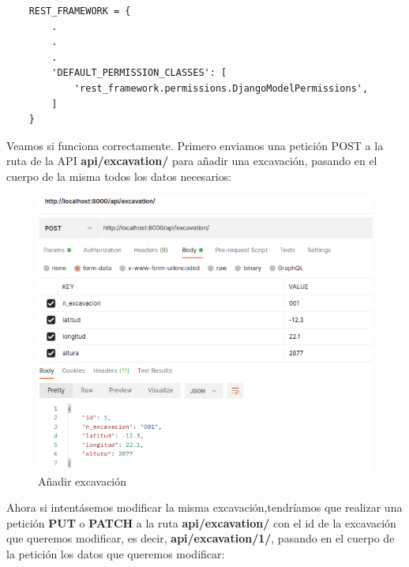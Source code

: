     
    \begin{verbatim}
    REST_FRAMEWORK = {
        .
        .
        .
        'DEFAULT_PERMISSION_CLASSES': [
            'rest_framework.permissions.DjangoModelPermissions',
        ]
    }
    \end{verbatim}

Veamos si funciona correctamente. Primero enviamos una petición POST a la ruta de la API
\textbf{api/excavation/} para añadir una excavación, pasando en el cuerpo de la misma
todos los datos necesarios:

        \begin{figure}[H]
            \centering
            \includegraphics[scale=0.40]{imagenes/post-excavation.png}
            \caption{Añadir excavación}
            \label{fig:post-excavation}
        \end{figure}

Ahora si intentásemos modificar la misma excavación,tendríamos que realizar una petición
\textbf{PUT} o \textbf{PATCH} a la ruta \textbf{api/excavation/} con el id de la excavación
que queremos modificar, es decir, \textbf{api/excavation/1/}, pasando en el cuerpo de la
petición los datos que queremos modificar:

